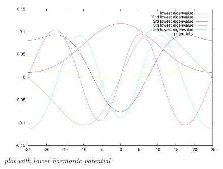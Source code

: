 \documentclass[11pt,a4paper,notitlepage,onecolumn]{article}
\begin{document}
\begin{figure}
\centering
\includegraphics[width=\textwidth]{aufgabe3-lowpot.pdf}
\caption{\em \small plot with lower harmonic potential}
\end{figure}
\end{document}
